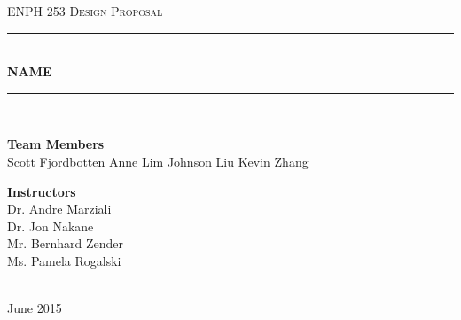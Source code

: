\documentclass[11pt, oneside]{article} %
\newcommand{\robotname}{NAME}
\begin{document}

\newcommand{\HRule}{\rule{\linewidth}{0.5mm}} %


\begin{titlepage}
\begin{center}

\textsc{\LARGE ENPH 253 Design Proposal}\\[1.5cm]

\HRule \\[0.4cm] %
{\huge \bfseries \robotname}\\[0.07cm]
\HRule \\[1.5cm] %

\begin{minipage}[t]{0.4\textwidth}
\begin{flushleft} \large
\textbf{Team Members} \\
{Scott Fjordbotten \newline Anne Lim \newline Johnson Liu \newline Kevin Zhang} %
\end{flushleft}
\end{minipage}
\begin{minipage}[t]{0.4\textwidth}
\begin{flushright} \large
\textbf{Instructors} \\
{Dr. Andre Marziali \\ Dr. Jon Nakane \\ Mr. Bernhard Zender \\ Ms. Pamela Rogalski} %
\end{flushright}
\end{minipage}\\[3cm]
 
 
{\large June 2015}\\[4cm]
 
\vfill
\end{center}

\end{titlepage}
\end{document}
